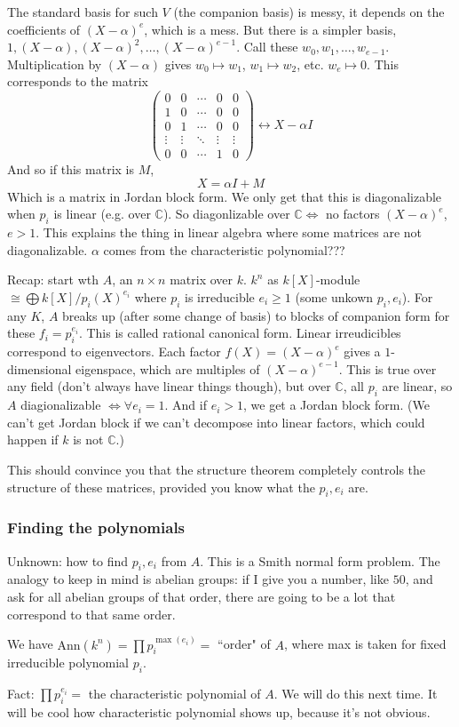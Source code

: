 \documentclass{article}
\theoremstyle{plain}
\theoremstyle{remark}
\newcommand{\C}{{\mathbb C}}
\begin{document}
The standard basis for such $V$ (the companion basis) is messy,
it depends on the coefficients of $(X-\alpha)^e$, which is a mess.
But there is a simpler basis, $1, (X-\alpha), (X-\alpha)^2,
\dots,(X-\alpha)^{e-1}$.
Call these $w_0,w_1,\dots,w_{e-1}$.
Multiplication by $(X-\alpha)$ gives
$w_0 \mapsto w_1$, $w_1 \mapsto w_2$, etc. $w_e \mapsto 0$.
This corresponds to the matrix
\[
	\begin{pmatrix}
		0 & 0 & \cdots & 0 & 0\\
		1 & 0 & \cdots & 0 & 0\\
		0 & 1 & \cdots & 0 & 0\\
		\vdots & \vdots & \ddots & \vdots & \vdots\\
		0 & 0 & \cdots & 1 & 0
	\end{pmatrix}
	\leftrightarrow X - \alpha I
\]
And so if this matrix is $M$,
\[
	X = \alpha I + M
\]
Which is a matrix in Jordan block form.
We only get that this is diagonalizable when $p_i$ is linear (e.g. over $\C$).
So diagonlizable over $\C \iff $ no factors $(X-\alpha)^e$, $e > 1$.
This explains the thing in linear algebra where some matrices are not diagonalizable.
$\alpha$ comes from the characteristic polynomial???

Recap:
start wth $A$, an $n \times n$ matrix over $k$.
$k^n$ as $k[X]$-module $\cong \bigoplus k[X]/p_i(X)^{e_i}$
where $p_i$ is irreducible $e_i \geq 1$
(some unkown $p_i,e_i$).
For any $K$, $A$ breaks up (after some change of basis)
to blocks of companion form for these $f_i = p_i^{e_i}$.
This is called rational canonical form.
Linear irreudicibles correspond to eigenvectors.
Each factor $f(X) = (X-\alpha)^e$ gives a $1$-dimensional eigenspace,
which are multiples of $(X-\alpha)^{e-1}$.
This is true over any field (don't always have linear things though),
but over $\C$, all $p_i$ are linear,
so $A$ diagionalizable $\iff \forall e_i = 1$.
And if $e_i > 1$, we get a Jordan block form.
(We can't get Jordan block if we can't decompose into linear factors,
which could happen if $k$ is not $\C$.)

This should convince you that the structure theorem completely controls
the structure of these matrices, provided you know what the $p_i,e_i$ are.

\subsubsection{Finding the polynomials}
Unknown: how to find $p_i,e_i$ from $A$.
This is a Smith normal form problem.
The analogy to keep in mind is abelian groups:
if I give you a number, like $50$, and ask for all abelian groups of that order,
there are going to be a lot that correspond to that same order.

We have $\mathrm{Ann}(k^n) = \prod p_i^{\max(e_i)} = $ ``order" of $A$,
where max is taken for fixed irreducible polynomial $p_i$.

Fact: $\prod p_i^{e_i} = $ the characteristic polynomial of $A$.
We will do this next time.
It will be cool how characteristic polynomial shows up,
because it's not obvious.
\end{document}
